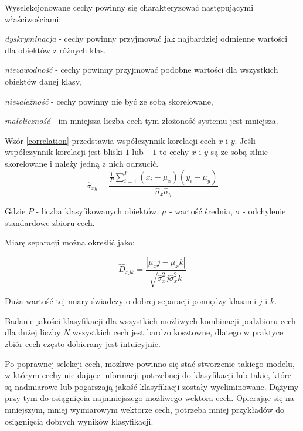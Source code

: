 Wyselekcjonowane cechy powinny się charakteryzować następującymi właściwościami\cite{STRUMIL}:

\begin{compactitem}
	\item \emph{dyskryminacja} - cechy powinny przyjmować jak najbardziej odmienne wartości dla obiektów z różnych klas,
	\item \emph{niezawodność} - cechy powinny przyjmować podobne wartości dla wszystkich obiektów danej klasy,
	\item \emph{niezależność} - cechy powinny nie być ze sobą skorelowane,
	\item \emph{małoliczność} - im mniejsza liczba cech tym złożoność systemu jest mniejsza.
\end{compactitem}

Wzór \ref{correlation} przedstawia współczynnik korelacji cech $x$ i $y$. Jeśli współczynnik korelacji jest bliski $1$ lub $-1$ to cechy $x$ i $y$ są ze sobą silnie skorelowane i należy jedną z nich odrzucić.
\begin{equation} 
\label{correlation} 
\hat{\sigma}_{xy}= \frac{\frac{1}{P}\sum\limits_{i=1}^P(x_i-\mu_x)(y_i-\mu_y)}{ \hat{\sigma}_x\hat{\sigma}_y }
\end{equation}

Gdzie $P$ - liczba klasyfikowanych obiektów, $\mu$ - wartość średnia, $\sigma$ - odchylenie standardowe zbioru cech.

Miarę separacji można określić jako:

\begin{equation}
	\hat{D}_{xjk} = \frac{|\mu_xj - \mu_xk|}{\sqrt{\hat{\sigma}^2_xj \hat{\sigma}^2_xk}}
\end{equation}

Duża wartość tej miary świadczy o dobrej separacji pomiędzy klasami $j$ i $k$.

Badanie jakości klasyfikacji dla wszystkich możliwych kombinacji podzbioru cech dla dużej liczby $N$ wszystkich cech jest bardzo kosztowne, dlatego w praktyce zbiór cech często dobierany jest intuicyjnie.\cite{STRUMIL}


Po poprawnej selekcji cech, możliwe powinno się stać stworzenie takiego modelu, w którym cechy nie dające informacji potrzebnej do klasyfikacji lub takie, które są nadmiarowe lub pogarszają jakość klasyfikacji zostały wyeliminowane. Dążymy przy tym do osiągnięcia najmniejszego możliwego wektora cech. Opierając się na mniejszym, mniej wymiarowym wektorze cech, potrzeba mniej przykładów do osiągnięcia dobrych wyników klasyfikacji.

